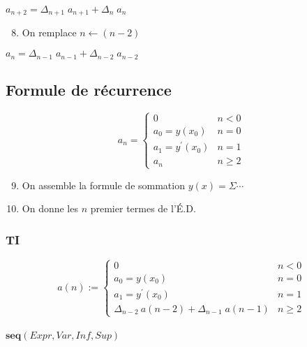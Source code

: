 \centering
\(
    a_{n+2} = \Delta_{n+1}\; a_{n+1}+\Delta_{n}\; a_{n}
\)
\begin{enumerate}[nosep]
\setcounter{enumi}{7}
    \item On remplace $n\leftarrow (n-2)$
\end{enumerate}
\centering
\(
    a_{n} = \Delta_{n-1}\; a_{n-1}+\Delta_{n-2}\; a_{n-2}
\)

\subsection{Formule de récurrence}
\begin{equation*}
   a_n= \left\{ \begin{array}{ll}
        0 & n<0 \\
        a_0=y(x_0) & n=0\\
        a_1=y^{\prime}(x_0) & n=1\\
        a_n & n\geq 2
    \end{array}\right.
\end{equation*}

\begin{enumerate}[nosep]
\setcounter{enumi}{8}
    \item On assemble la formule de sommation $y(x)=\Sigma\cdots$
    \item On donne les $n$ premier termes de l'É.D.
\end{enumerate}

\subsubsection{TI}
\begin{equation*}
    a(n):=\left\{ \begin{array}{ll}
        0 & n<0 \\
        a_0=y(x_0) & n=0\\
        a_1=y^{\prime}(x_0) & n=1\\
        \Delta_{n-2}\: a(n-2)+\Delta_{n-1}\; a(n-1) & n\geq 2
    \end{array}\right.
\end{equation*}\\
\vspace{.125em}
{\centering\(\mathbf{seq}(Expr,Var,Inf,Sup)\)}
\vspace{.125em}

